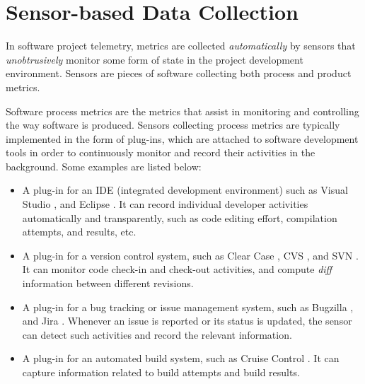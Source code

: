 
\section{Sensor-based Data Collection}
\label{Telemetry:Data}

In software project telemetry, metrics are collected \textit{automatically} by sensors that \textit{unobtrusively} monitor some form of state in the project development environment. Sensors are pieces of software collecting both process and product metrics.

Software process metrics are the metrics that assist in monitoring and controlling the way software is produced. Sensors collecting process metrics are typically implemented in the form of plug-ins, which are attached to software development tools in order to continuously monitor and record their activities in the background. Some examples are listed below:

\begin{itemize}

	\item A plug-in for an IDE (integrated development environment) such as Visual Studio \cite{Software:VisualStudio}, and Eclipse \cite{Software:Eclipse}. It can record individual developer activities automatically and transparently, such as code editing effort, compilation attempts, and results, etc.

  \item A plug-in for a version control system, such as Clear Case \cite{Software:ClearCase}, CVS \cite{Software:CVS}, and SVN \cite{Software:SVN}. It can monitor code check-in and check-out activities, and compute \textit{diff} information between different revisions.
  
  \item A plug-in for a bug tracking or issue management system, such as Bugzilla \cite{Software:Bugzilla}, and Jira \cite{Software:Jira}. Whenever an issue is reported or its status is updated, the sensor can detect such activities and record the relevant information.
  
  \item A plug-in for an automated build system, such as Cruise Control \cite{Software:CruiseControl}. It can capture information related to build attempts and build results.

\end{itemize}


